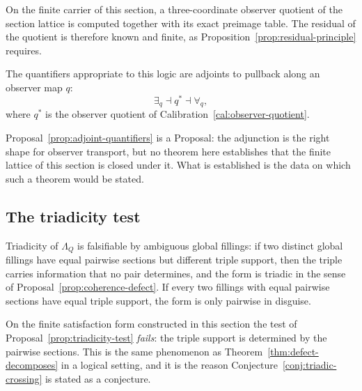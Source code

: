 \begin{calibration}\label{cal:observer-quotient}
On the finite carrier of this section, a three-coordinate observer quotient of the
section lattice is computed together with its exact preimage table.  The residual of the
quotient is therefore known and finite, as
Proposition~\ref{prop:residual-principle} requires.
\end{calibration}

\begin{proposal}\label{prop:adjoint-quantifiers}
The quantifiers appropriate to this logic are adjoints to pullback along an observer map
$q$:
\[
  \exists_q\dashv q^{\ast}\dashv\forall_q ,
\]
where $q^{\ast}$ is the observer quotient of Calibration~\ref{cal:observer-quotient}.
\end{proposal}

\begin{remark}
Proposal~\ref{prop:adjoint-quantifiers} is a \textsf{Proposal}: the adjunction is the
right shape for observer transport, but no theorem here establishes that the finite
lattice of this section is closed under it.  What is established is the data on which
such a theorem would be stated.
\end{remark}

\subsection{The triadicity test}

\begin{proposal}\label{prop:triadicity-test}
Triadicity of $\Lambda_Q$ is falsifiable by ambiguous global fillings: if two distinct
global fillings have equal pairwise sections but different triple support, then the triple
carries information that no pair determines, and the form is triadic in the sense of
Proposal~\ref{prop:coherence-defect}.  If every two fillings with equal pairwise sections
have equal triple support, the form is only pairwise in disguise.
\end{proposal}

\begin{calibration}\label{cal:triadicity-fails}
On the finite satisfaction form constructed in this section the test of
Proposal~\ref{prop:triadicity-test} \emph{fails}: the triple support is determined by the
pairwise sections.  This is the same phenomenon as
Theorem~\ref{thm:defect-decomposes} in a logical setting, and it is the reason
Conjecture~\ref{conj:triadic-crossing} is stated as a conjecture.
\end{calibration}

